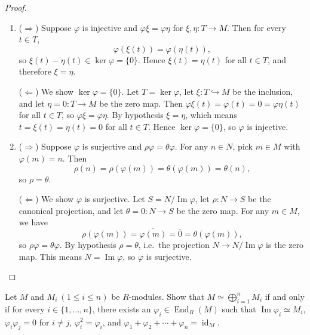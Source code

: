 \begin{proof}
    \begin{enumerate}
        \item ($\Rightarrow$) Suppose $\varphi$ is injective and $\varphi\xi=\varphi\eta$ for $\xi,\eta:T\to M$. Then for every $t\in T$,
              \[
                  \varphi(\xi(t))=\varphi(\eta(t)),
              \]
              so $\xi(t)-\eta(t)\in\ker\varphi=\{0\}$. Hence $\xi(t)=\eta(t)$ for all $t\in T$, and therefore $\xi=\eta$.

              ($\Leftarrow$) We show $\ker\varphi=\{0\}$. Let $T=\ker\varphi$, let $\xi:T\hookrightarrow M$ be the inclusion, and let $\eta=0:T\to M$ be the zero map. Then $\varphi\xi(t)=\varphi(t)=0=\varphi\eta(t)$ for all $t\in T$, so $\varphi\xi=\varphi\eta$. By hypothesis $\xi=\eta$, which means $t=\xi(t)=\eta(t)=0$ for all $t\in T$. Hence $\ker\varphi=\{0\}$, so $\varphi$ is injective.

        \item ($\Rightarrow$) Suppose $\varphi$ is surjective and $\rho\varphi=\theta\varphi$. For any $n\in N$, pick $m\in M$ with $\varphi(m)=n$. Then
              \[
                  \rho(n)=\rho(\varphi(m))=\theta(\varphi(m))=\theta(n),
              \]
              so $\rho=\theta$.

              ($\Leftarrow$) We show $\varphi$ is surjective. Let $S=N/\operatorname{Im}\varphi$, let $\rho:N\to S$ be the canonical projection, and let $\theta=0:N\to S$ be the zero map. For any $m\in M$, we have
              \[
                  \rho(\varphi(m))=\overline{\varphi(m)}=\bar 0=\theta(\varphi(m)),
              \]
              so $\rho\varphi=\theta\varphi$. By hypothesis $\rho=\theta$, i.e.\ the projection $N\to N/\operatorname{Im}\varphi$ is the zero map. This means $N=\operatorname{Im}\varphi$, so $\varphi$ is surjective.
    \end{enumerate}
\end{proof}

\begin{exercise}
    Let $M$ and $M_i\ (1 \le i \le n)$ be $R$-modules. Show that $M \simeq \bigoplus_{i=1}^{n} M_i$ if and only if for every $i \in \{1, \ldots, n\}$, there exists an $\varphi_i \in \operatorname{End}_R(M)$ such that $\operatorname{Im}\varphi_i \simeq M_i$, $\varphi_i\varphi_j = 0$ for $i \neq j$, $\varphi_i^2 = \varphi_i$, and $\varphi_1 + \varphi_2 + \cdots + \varphi_n = \operatorname{id}_M$.
\end{exercise}

